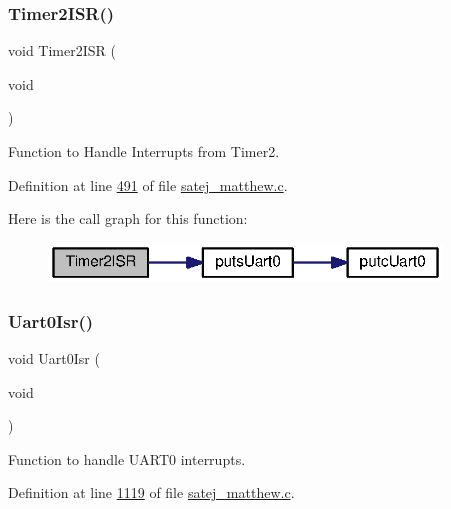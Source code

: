 \subsubsection{\texorpdfstring{Timer2ISR()}{Timer2ISR()}}
{\footnotesize\ttfamily void Timer2\+I\+SR (\begin{DoxyParamCaption}\item[{void}]{ }\end{DoxyParamCaption})}



Function to Handle Interrupts from Timer2. 



Definition at line \mbox{\hyperlink{satej__matthew_8c_source_l00491}{491}} of file \mbox{\hyperlink{satej__matthew_8c_source}{satej\+\_\+matthew.\+c}}.

Here is the call graph for this function\+:
\nopagebreak
\begin{figure}[H]
\begin{center}
\leavevmode
\includegraphics[width=296pt]{satej__matthew_8c_af0a12620be9cfe02c43ff4c8d6556fe2_cgraph}
\end{center}
\end{figure}
\mbox{\label{satej__matthew_8c_a039b2e346ff80ac384bb076fc5290996}} 
\subsubsection{\texorpdfstring{Uart0Isr()}{Uart0Isr()}}
{\footnotesize\ttfamily void Uart0\+Isr (\begin{DoxyParamCaption}\item[{void}]{ }\end{DoxyParamCaption})}



Function to handle U\+A\+R\+T0 interrupts. 



Definition at line \mbox{\hyperlink{satej__matthew_8c_source_l01119}{1119}} of file \mbox{\hyperlink{satej__matthew_8c_source}{satej\+\_\+matthew.\+c}}.

